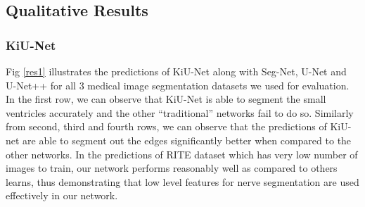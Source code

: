 \documentclass[journal,twoside,web]{ieeecolor}
\begin{document}
\subsection{Qualitative Results}

\subsubsection{KiU-Net}

Fig \ref{res1} illustrates the predictions of KiU-Net along with Seg-Net, U-Net and U-Net++ for all 3 medical image segmentation datasets we used for evaluation. In the first row, we can observe that KiU-Net is able to segment the small ventricles accurately and  the other ``traditional''  networks fail to do so. Similarly from second, third and fourth rows, we can observe that the predictions of KiU-net are able to segment out the  edges significantly better  when compared to the other networks. In the predictions of RITE dataset which has very low number of images to train, our network performs reasonably well as compared to others  learns, thus demonstrating that low level features for nerve segmentation are used effectively in our network.
\end{document}
